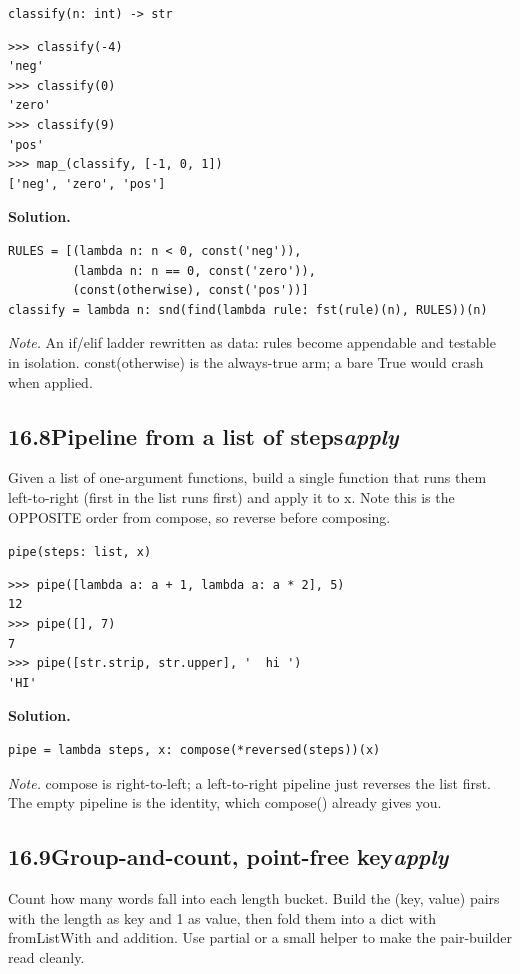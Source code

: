 \documentclass[10pt,letterpaper]{book}
\begin{document}
\noindent\texttt{classify(n: int) -> str}
\begin{lstlisting}[style=ex]
>>> classify(-4)
'neg'
>>> classify(0)
'zero'
>>> classify(9)
'pos'
>>> map_(classify, [-1, 0, 1])
['neg', 'zero', 'pos']
\end{lstlisting}
\noindent\textbf{Solution.}
\begin{lstlisting}[style=code]
RULES = [(lambda n: n < 0, const('neg')),
         (lambda n: n == 0, const('zero')),
         (const(otherwise), const('pos'))]
classify = lambda n: snd(find(lambda rule: fst(rule)(n), RULES))(n)
\end{lstlisting}
\noindent\textit{Note.} An if/elif ladder rewritten as data: rules become appendable and testable in isolation. const(otherwise) is the always-true arm; a bare True would crash when applied.

\subsection*{16.8\quad Pipeline from a list of steps\hfill\textnormal{\textit{apply}}}
Given a list of one-argument functions, build a single function that runs them left-to-right (first in the list runs first) and apply it to x. Note this is the OPPOSITE order from compose, so reverse before composing.

\noindent\texttt{pipe(steps: list, x)}
\begin{lstlisting}[style=ex]
>>> pipe([lambda a: a + 1, lambda a: a * 2], 5)
12
>>> pipe([], 7)
7
>>> pipe([str.strip, str.upper], '  hi ')
'HI'
\end{lstlisting}
\noindent\textbf{Solution.}
\begin{lstlisting}[style=code]
pipe = lambda steps, x: compose(*reversed(steps))(x)
\end{lstlisting}
\noindent\textit{Note.} compose is right-to-left; a left-to-right pipeline just reverses the list first. The empty pipeline is the identity, which compose() already gives you.

\subsection*{16.9\quad Group-and-count, point-free key\hfill\textnormal{\textit{apply}}}
Count how many words fall into each length bucket. Build the (key, value) pairs with the length as key and 1 as value, then fold them into a dict with fromListWith and addition. Use partial or a small helper to make the pair-builder read cleanly.
\end{document}
